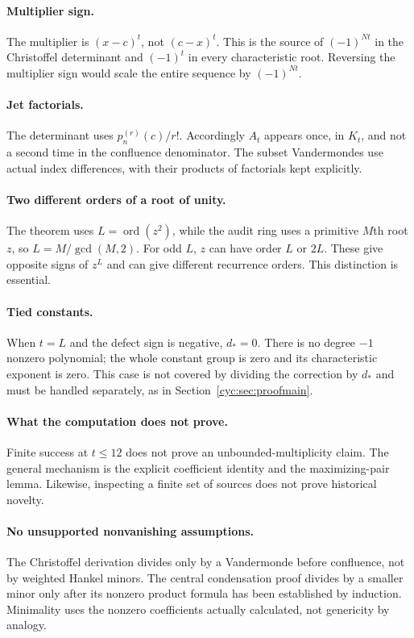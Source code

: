 \documentclass[11pt,a4paper]{article}
\numberwithin{equation}{section}
\theoremstyle{definition}
\theoremstyle{remark}
\newcommand{\ord}{\operatorname{ord}}
\begin{document}
\paragraph{Multiplier sign.}
The multiplier is $(x-c)^t$, not $(c-x)^t$.
This is the source of $(-1)^{Nt}$ in the Christoffel determinant and
$(-1)^t$ in every characteristic root.  Reversing the multiplier sign
would scale the entire sequence by $(-1)^{Nt}$.

\paragraph{Jet factorials.}
The determinant uses $p_n^{(r)}(c)/r!$.  Accordingly $A_t$ appears
once, in $K_t$, and not a second time in the confluence denominator.
The subset Vandermondes use actual index differences, with their
products of factorials kept explicitly.

\paragraph{Two different orders of a root of unity.}
The theorem uses $L=\ord(z^2)$, while the audit ring uses a primitive
$M$th root $z$, so $L=M/\gcd(M,2)$.  For odd $L$, $z$ can have
order $L$ or $2L$.  These give opposite signs of $z^L$ and can give
different recurrence orders.  This distinction is essential.

\paragraph{Tied constants.}
When $t=L$ and the defect sign is negative, $d_*=0$.
There is no degree $-1$ nonzero polynomial; the whole constant group
is zero and its characteristic exponent is zero.  This case is not
covered by dividing the correction by $d_*$ and must be handled
separately, as in Section~\ref{cyc:sec:proofmain}.

\paragraph{What the computation does not prove.}
Finite success at $t\le12$ does not prove an unbounded-multiplicity
claim.  The general mechanism is the explicit coefficient identity
and the maximizing-pair lemma.  Likewise, inspecting a finite set of
sources does not prove historical novelty.

\paragraph{No unsupported nonvanishing assumptions.}
The Christoffel derivation divides only by a Vandermonde before
confluence, not by weighted Hankel minors.  The central condensation
proof divides by a smaller minor only after its nonzero product
formula has been established by induction.  Minimality uses the
nonzero coefficients actually calculated, not genericity by analogy.
\end{document}

